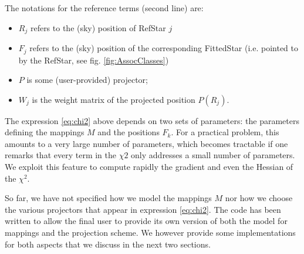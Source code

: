 \documentclass[a4paper,12pt]{scrartcl}
\begin{document}
The notations for the reference terms (second line) are:
\begin{itemize}
\item $R_j$ refers to the (sky) position of RefStar $j$
\item $F_j$ refers to the (sky) position of the corresponding
FittedStar (i.e. pointed to by the RefStar, see fig. \ref{fig:AssocClasses})
\item $P$ is some (user-provided) projector;
\item $W_j$ is the weight matrix of the projected position $P(R_j)$. 
\end{itemize}

The expression \ref{eq:chi2} above depends on two sets of parameters:
the parameters defining the mappings $M$ and the positions $F_k$.
For a practical problem, this amounts to a very large number of parameters,
which becomes tractable if one remarks that every term in the $\chi2$ 
only addresses a small number of parameters. We exploit this feature 
to compute rapidly the gradient and even the Hessian of the $\chi^2$.

So far, we have not specified how
we model the mappings $M$ nor how we choose the various projectors 
that appear in expression \ref{eq:chi2}. The code has been written
to allow the final user to provide its own version of both the model
for mappings and the projection scheme. We however provide some 
implementations for both aspects that we discuss in the next two sections.
\end{document}
